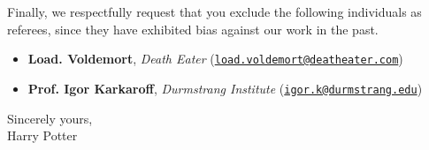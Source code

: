 \documentclass[
]{scrartcl}
\providecommand{\tightlist}{%
  \setlength{\itemsep}{0pt}\setlength{\parskip}{0pt}}
\begin{document}
Finally, we respectfully request that you exclude the following individuals as referees, since they have exhibited bias against our work in the past.

\label{exclude}
\begin{itemize}
\tightlist
\item
  \textbf{Load. Voldemort}, \emph{Death Eater} (\href{mailto:load.voldemort@deatheater.com}{\nolinkurl{load.voldemort@deatheater.com}})
\item
  \textbf{Prof. Igor Karkaroff}, \emph{Durmstrang Institute} (\href{mailto:igor.k@durmstrang.edu}{\nolinkurl{igor.k@durmstrang.edu}})
\end{itemize}

Sincerely yours,\\
Harry Potter



\end{document}
